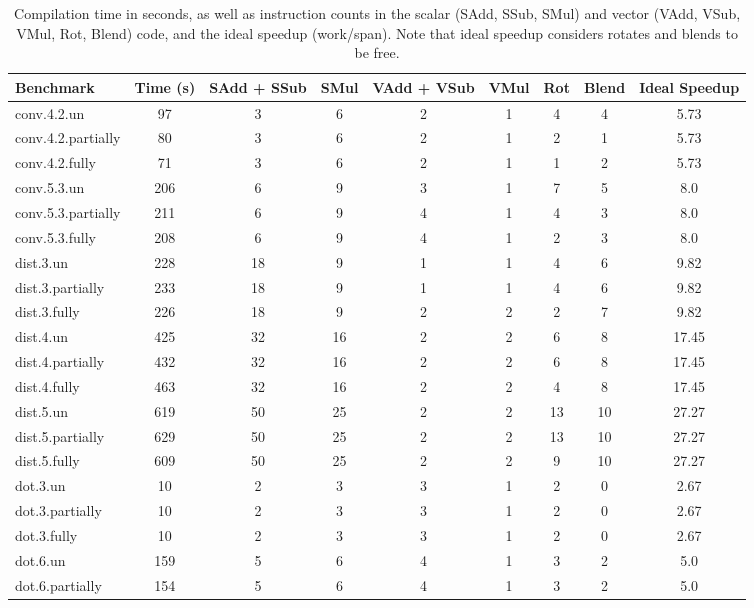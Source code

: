 \begin{table}
	\small
	\centering
    \caption{Compilation time in seconds, as well as instruction counts in the scalar (SAdd, SSub, SMul) and vector (VAdd, VSub, VMul, Rot, Blend) code, and the ideal speedup (work/span). Note that ideal speedup considers rotates and blends to be free.}\label{tab:big-ass}
    \vspace{-0.5em}
    \begin{tabular}{lcccccccc}
    \toprule
    Benchmark & Time (s) & SAdd + SSub & SMul & VAdd + VSub & VMul & Rot & Blend & Ideal Speedup\\\midrule
    conv.4.2.un & 97 & 3 & 6 & 2 & 1 & 4 & 4 & 5.73\\
    conv.4.2.partially & 80 & 3 & 6 & 2 & 1 & 2 & 1 & 5.73\\
    conv.4.2.fully & 71 & 3 & 6 & 2 & 1 & 1 & 2 & 5.73\\
    \midrule
    conv.5.3.un & 206 & 6 & 9 & 3 & 1 & 7 & 5 & 8.0\\
    conv.5.3.partially & 211 & 6 & 9 & 4 & 1 & 4 & 3 & 8.0\\
    conv.5.3.fully & 208 & 6 & 9 & 4 & 1 & 2 & 3 & 8.0\\
    \midrule
    dist.3.un & 228 & 18 & 9 & 1 & 1 & 4 & 6 & 9.82\\
    dist.3.partially & 233 & 18 & 9 & 1 & 1 & 4 & 6 & 9.82\\
    dist.3.fully & 226 & 18 & 9 & 2 & 2 & 2 & 7 & 9.82\\
    \midrule
    dist.4.un & 425 & 32 & 16 & 2 & 2 & 6 & 8 & 17.45\\
    dist.4.partially & 432 & 32 & 16 & 2 & 2 & 6 & 8 & 17.45\\
    dist.4.fully & 463 & 32 & 16 & 2 & 2 & 4 & 8 & 17.45\\
    \midrule
    dist.5.un & 619 & 50 & 25 & 2 & 2 & 13 & 10 & 27.27\\
    dist.5.partially & 629 & 50 & 25 & 2 & 2 & 13 & 10 & 27.27\\
    dist.5.fully & 609 & 50 & 25 & 2 & 2 & 9 & 10 & 27.27\\
    \midrule
    dot.3.un & 10 & 2 & 3 & 3 & 1 & 2 & 0 & 2.67\\
    dot.3.partially & 10 & 2 & 3 & 3 & 1 & 2 & 0 & 2.67\\
    dot.3.fully & 10 & 2 & 3 & 3 & 1 & 2 & 0 & 2.67\\
    \midrule
    dot.6.un & 159 & 5 & 6 & 4 & 1 & 3 & 2 & 5.0\\
    dot.6.partially & 154 & 5 & 6 & 4 & 1 & 3 & 2 & 5.0\\

\end{tabular}
\end{table}
